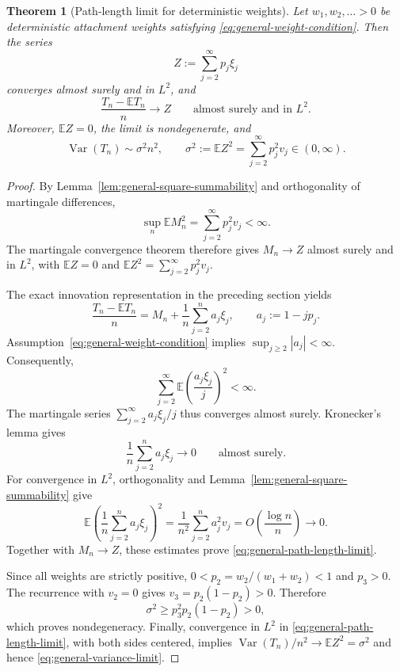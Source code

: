 \documentclass[11pt,a4paper]{article}
\newtheorem{theorem}{Theorem}[section]
\newcommand{\E}{\mathbb{E}}
\newcommand{\1}{\mathbf{1}}
\begin{document}
\begin{theorem}[Path-length limit for deterministic weights]
\label{thm:general-path-length-limit}
Let $w_1,w_2,\ldots>0$ be deterministic attachment weights satisfying
\eqref{eq:general-weight-condition}.  Then the series
\begin{equation}
  Z:=\sum_{j=2}^{\infty}p_j\xi_j
  \label{eq:general-limit-series}
\end{equation}
converges almost surely and in $L^2$, and
\begin{equation}
  \frac{T_n-\E T_n}{n}\longrightarrow Z
  \qquad\text{almost surely and in }L^2.
  \label{eq:general-path-length-limit}
\end{equation}
Moreover, $\E Z=0$, the limit is nondegenerate, and
\begin{equation}
  \operatorname{Var}(T_n)\sim\sigma^2n^2,
  \qquad
  \sigma^2:=\E Z^2
    =\sum_{j=2}^{\infty}p_j^2v_j\in(0,\infty).
  \label{eq:general-variance-limit}
\end{equation}
\end{theorem}


\begin{proof}
By Lemma~\ref{lem:general-square-summability} and orthogonality of
martingale differences,
\[
  \sup_n\E M_n^2
  =\sum_{j=2}^{\infty}p_j^2v_j<\infty.
\]
The martingale convergence theorem therefore gives $M_n\to Z$ almost
surely and in $L^2$, with $\E Z=0$ and
$\E Z^2=\sum_{j=2}^{\infty}p_j^2v_j$.

The exact innovation representation in the preceding section yields
\begin{equation}
  \frac{T_n-\E T_n}{n}
  =M_n+\frac1n\sum_{j=2}^n a_j\xi_j,
  \qquad a_j:=1-jp_j.
  \label{eq:general-limit-remainder}
\end{equation}
Assumption~\eqref{eq:general-weight-condition} implies
$\sup_{j\ge2}|a_j|<\infty$.  Consequently,
\[
  \sum_{j=2}^{\infty}
    \E\left(\frac{a_j\xi_j}{j}\right)^2<\infty.
\]
The martingale series $\sum_{j=2}^{\infty}a_j\xi_j/j$ thus converges
almost surely.  Kronecker's lemma gives
\[
  \frac1n\sum_{j=2}^n a_j\xi_j\longrightarrow0
  \qquad\text{almost surely}.
\]
For convergence in $L^2$, orthogonality and
Lemma~\ref{lem:general-square-summability} give
\[
  \E\left(\frac1n\sum_{j=2}^n a_j\xi_j\right)^2
  =\frac1{n^2}\sum_{j=2}^n a_j^2v_j
  =O\left(\frac{\log n}{n}\right)\longrightarrow0.
\]
Together with $M_n\to Z$, these estimates prove
\eqref{eq:general-path-length-limit}.

Since all weights are strictly positive,
$0<p_2=w_2/(w_1+w_2)<1$ and $p_3>0$.  The recurrence with $v_2=0$
gives $v_3=p_2(1-p_2)>0$.  Therefore
\[
  \sigma^2\ge p_3^2p_2(1-p_2)>0,
\]
which proves nondegeneracy.  Finally, convergence in $L^2$ in
\eqref{eq:general-path-length-limit}, with both sides centered, implies
$\operatorname{Var}(T_n)/n^2\to\E Z^2=\sigma^2$ and hence
\eqref{eq:general-variance-limit}.
\end{proof}
\end{document}
